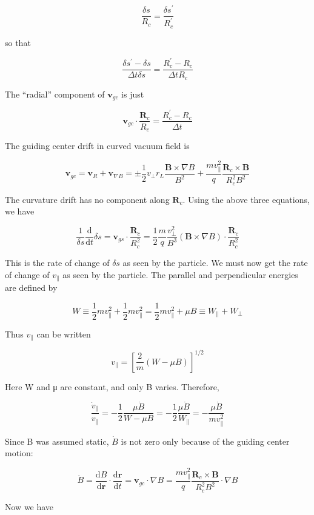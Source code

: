 \documentclass[
  notoc %
]{tufte-book}
\begin{document}
\[
\frac{\delta s}{R_c} = \frac{\delta s^\prime}{R_c^\prime}
\]

so that

\[
\frac{\delta s^\prime - \delta s}{\Delta t \delta s} = \frac{R_c^\prime - R_c}{\Delta t R_c}
\]

The ``radial'' component of \(\mathbf{v}_{gc}\) is just

\[
\mathbf{v}_{gc}\cdot \frac{\mathbf{R}_c}{R_c} = \frac{R_c^\prime - R_c}{\Delta t}
\]

The guiding center drift in curved vacuum field is

\[
\mathbf{v}_{gc} = \mathbf{v}_R + \mathbf{v}_{\nabla B} = \pm \frac{1}{2}v_\perp r_L\frac{\mathbf{B}\times\nabla B}{B^2} + \frac{mv_\parallel^2}{q}\frac{\mathbf{R}_c \times\mathbf{B}}{R_c^2 B^2}
\]

The curvature drift has no component along \(\mathbf{R}_c\). Using the
above three equations, we have

\[
\frac{1}{\delta s}\frac{\mathrm{d}}{\mathrm{d}t}\delta s = \mathbf{v}_{gs} \cdot \frac{\mathbf{R}_c}{R_c^2} = \frac{1}{2}\frac{m}{q}\frac{v_\perp^2}{B^3}(\mathbf{B}\times\nabla B)\cdot\frac{\mathbf{R}_c}{R_c^2}
\]

This is the rate of change of \(\delta s\) as seen by the particle. We
must now get the rate of change of \(v_\parallel\) as seen by the
particle. The parallel and perpendicular energies are defined by

\[
W \equiv \frac{1}{2}mv_\parallel^2 + \frac{1}{2}mv_\parallel^2 = \frac{1}{2}mv_\parallel^2 + \mu B \equiv W_\parallel + W_\perp
\]

Thus \(v_\parallel\) can be written

\[
v_\parallel = \left[ \frac{2}{m}(W - \mu B) \right]^{1/2}
\]

Here W and μ are constant, and only B varies. Therefore,

\[
\frac{\dot{v}_\parallel}{v_\parallel} = -\frac{1}{2}\frac{\mu\dot{B}}{W - \mu B} = -\frac{1}{2}\frac{\mu \dot{B}}{W_\parallel} = -\frac{\mu\dot{B}}{mv_\parallel^2}
\]

Since B was assumed static, \(\dot{B}\) is not zero only because of the
guiding center motion:

\[
\dot{B} = \frac{\mathrm{d}B}{\mathrm{d}\mathbf{r}}\cdot\frac{\mathrm{d}\mathbf{r}}{\mathrm{d}t} = \mathbf{v}_{gc}\cdot\nabla B = \frac{mv_\parallel^2}{q}\frac{\mathbf{R}_c \times\mathbf{B}}{R_c^2 B^2} \cdot\nabla B
\]

Now we have
\end{document}

